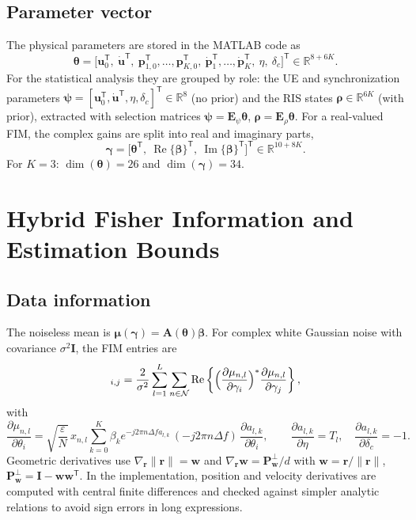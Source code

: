 \documentclass[11pt,a4paper]{article}
\newcommand{\vect}[1]{\bm{#1}}
\newcommand{\T}{\mathsf{T}}
\newcommand{\udot}{\dot{\vect{u}}}
\newcommand{\pdot}{\dot{\vect{p}}}
\renewcommand{\Re}{\operatorname{Re}}
\renewcommand{\Im}{\operatorname{Im}}
\begin{document}
\subsection{Parameter vector}
The physical parameters are stored in the MATLAB code as
\begin{equation}
\vect{\theta}=\bigl[\vect{u}_0^{\T},\ \udot^{\T},\ \vect{p}_{1,0}^{\T},\dots,\vect{p}_{K,0}^{\T},\
\pdot_1^{\T},\dots,\pdot_K^{\T},\ \eta,\ \delta_c\bigr]^{\T}\in\mathbb{R}^{8+6K}.
\end{equation}
For the statistical analysis they are grouped by role: the UE and synchronization parameters
$\vect{\psi}=[\vect{u}_0^{\T},\udot^{\T},\eta,\delta_c]^{\T}\in\mathbb{R}^8$ (no prior) and the RIS states
$\vect{\rho}\in\mathbb{R}^{6K}$ (with prior), extracted with selection matrices $\vect{\psi}=\vect{E}_\psi\vect{\theta}$,
$\vect{\rho}=\vect{E}_\rho\vect{\theta}$. For a real-valued FIM, the complex gains are split into real and
imaginary parts,
\begin{equation}
\vect{\gamma}=\bigl[\vect{\theta}^{\T},\ \Re\{\vect{\beta}\}^{\T},\ \Im\{\vect{\beta}\}^{\T}\bigr]^{\T}\in\mathbb{R}^{10+8K}.
\end{equation}
For $K=3$: $\dim(\vect{\theta})=26$ and $\dim(\vect{\gamma})=34$.

\section{Hybrid Fisher Information and Estimation Bounds}

\subsection{Data information}
The noiseless mean is $\vect{\mu}(\vect{\gamma})=\vect{A}(\vect{\theta})\vect{\beta}$. For complex white
Gaussian noise with covariance $\sigma^2\vect{I}$, the FIM entries are~\cite{kay1993}
\begin{equation}
[\vect{J}_{\mathrm{data}}]_{i,j}=\frac{2}{\sigma^2}\sum_{l=1}^{L}\sum_{n\in\mathcal{N}}
\Re\left\{\Bigl(\frac{\partial\mu_{n,l}}{\partial\gamma_i}\Bigr)^{*}\frac{\partial\mu_{n,l}}{\partial\gamma_j}\right\},
\end{equation}
with
\begin{equation}
\frac{\partial\mu_{n,l}}{\partial\theta_i}=\sqrt{\frac{\varepsilon}{N}}\,x_{n,l}\sum_{k=0}^{K}\beta_k
e^{-j2\pi n\Delta f a_{l,k}}\,(-j2\pi n\Delta f)\,\frac{\partial a_{l,k}}{\partial\theta_i},
\qquad \frac{\partial a_{l,k}}{\partial\eta}=T_l,\quad \frac{\partial a_{l,k}}{\partial\delta_c}=-1 .
\end{equation}
Geometric derivatives use $\nabla_{\vect{r}}\|\vect{r}\|=\vect{w}$ and
$\nabla_{\vect{r}}\vect{w}=\vect{P}^{\perp}_{\vect{w}}/d$ with $\vect{w}=\vect{r}/\|\vect{r}\|$,
$\vect{P}^{\perp}_{\vect{w}}=\vect{I}-\vect{w}\vect{w}^{\T}$. In the implementation, position and velocity
derivatives are computed with central finite differences and checked against simpler analytic relations to avoid
sign errors in long expressions.
\end{document}
